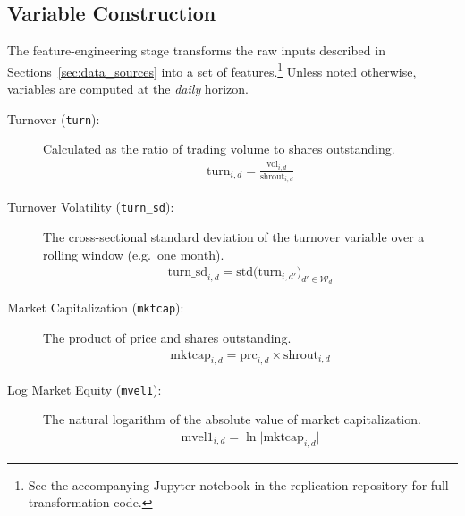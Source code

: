 \subsection{Variable Construction}\label{sec:var_construct}
The feature-engineering stage transforms the raw inputs described in Sections~\ref{sec:data_sources} into a set of features.\footnote{See the accompanying Jupyter notebook in the replication repository for full transformation code.}  Unless noted otherwise, variables are computed at the \emph{daily} horizon.

\begin{description}
  \item[Turnover (\texttt{turn}):]  
    Calculated as the ratio of trading volume to shares outstanding.
    \begin{equation}
    \label{eq:turn}
    \begin{split}
    \text{turn}_{i,d} = \frac{\text{vol}_{i,d}}{\text{shrout}_{i,d}}
    \end{split}
    \end{equation}

  \item[Turnover Volatility (\texttt{turn\_sd}):]  
    The cross-sectional standard deviation of the turnover variable over a rolling window (e.g.\ one month).
    \begin{equation}
    \label{eq:turn_sd}
    \begin{split}
    \text{turn\_sd}_{i,d} = \mathrm{std}\bigl(\text{turn}_{i,d'}\bigr)_{d' \in \mathcal{W}_d}
    \end{split}
    \end{equation}

  \item[Market Capitalization (\texttt{mktcap}):]  
    The product of price and shares outstanding.
    \begin{equation}
    \label{eq:mktcap}
    \begin{split}
    \text{mktcap}_{i,d} = \text{prc}_{i,d}\times \text{shrout}_{i,d}
    \end{split}
    \end{equation}

  \item[Log Market Equity (\texttt{mvel1}):]  
    The natural logarithm of the absolute value of market capitalization.
    \begin{equation}
    \label{eq:mvel1}
    \begin{split}
    \text{mvel1}_{i,d} = \ln\bigl|\text{mktcap}_{i,d}\bigr|
    \end{split}
    \end{equation}


\end{description}
